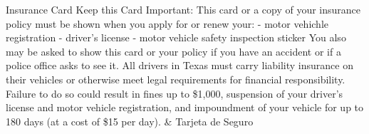 \documentclass{article}
\begin{document}
\begin{tabularx}
Insurance Card \newline
Keep this Card \newline
Important: This card or a copy of your insurance policy \newline
must be shown when you apply for or renew your: \newline
- motor vehichle registration \newline
- driver’s license \newline
- motor vehicle safety inspection sticker \newline
You also may be asked to show this card or your policy if \newline
you have an accident or if a police office asks to see it. \newline
All drivers in Texas must carry liability insurance on their \newline
vehicles or otherwise meet legal requirements for financial \newline
responsibility. Failure to do so could result in fines up to \newline
\$1,000, suspension of your driver’s license and motor \newline
vehicle registration, and impoundment of your vehicle for \newline
up to 180 days (at a cost of \$15 per day). &
Tarjeta de Seguro \\
\hline
\end{tabularx}
\end{document}
